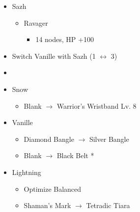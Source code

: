 \begin{paracol}{2}
\begin{menu}
\begin{itemize}
\begin{itemize}
\begin{itemize}
\begin{itemize}
				            \end{itemize}
			      \end{itemize}
			\item Sazh
			      \begin{itemize}
				      \item Ravager
				            \begin{itemize}
					            \item 14 nodes,  HP +100
				            \end{itemize}
			      \end{itemize}
		\end{itemize}
		\paradigm
		\begin{itemize}
			\item Switch Vanille with Sazh (1 $\leftrightarrow$ 3)
			\item {}%
			      {\paradigmline{\com}{(\com)}{(\com)}}%
			      {\paradigmline[2]{\textit{\com}}{\textit{(\com)}}{\textit{(\com)}}}%
			      {\paradigmline{\syn}{\sen}{(\sab)}}%
			      {\paradigmline{[\syn]}{\rav}{\med}}%
			      {\paradigmline{[\rav]}{\rav}{\med}}%
			      {\paradigmline{\rav}{\rav}{[\rav]}}
		\end{itemize}
		\equip
		\begin{itemize}
			\item Snow
			      \begin{itemize}
				      \item Blank $\rightarrow$ Warrior's Wristband Lv. 8
			      \end{itemize}
			\item Vanille
			      \begin{itemize}
				      \item Diamond Bangle $\rightarrow$ Silver Bangle
				      \item Blank $\rightarrow$ Black Belt *
			      \end{itemize}
			\item Lightning
			      \begin{itemize}
				      \item Optimize Balanced
				      \item Shaman's Mark $\rightarrow$ Tetradic Tiara
			      \end{itemize}
		\end{itemize}
	\end{itemize}
\end{menu}
\switchcolumn
\begin{menu}

\end{menu}
\end{paracol}
